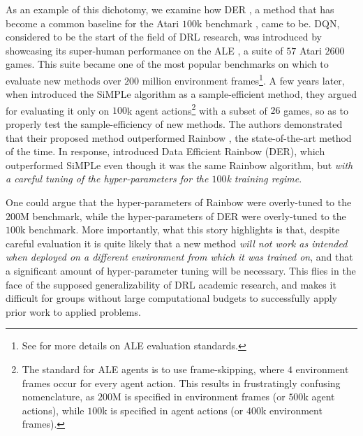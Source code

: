 \documentclass[10pt]{article} %
\begin{document}
As an example of this dichotomy, we examine how DER \citep{hasselt19when}, a method that has become a common baseline for the Atari $100$k benchmark \citep{kaiser2020modelbased}, came to be. DQN, considered to be the start of the field of DRL research, was introduced by showcasing its super-human performance on the ALE \citep{bellemare2012ale}, a suite of $57$ Atari $2600$ games. This suite became one of the most popular benchmarks on which to evaluate new methods over $200$ million environment frames\footnote{See \citep{machado2018revisiting} for more details on ALE evaluation standards.}. A few years later, when \citet{kaiser2020modelbased} introduced the SiMPLe algorithm as a sample-efficient method, they argued for evaluating it only on $100$k agent actions\footnote{The standard for ALE agents is to use frame-skipping, where $4$ environment frames occur for every agent action. This results in frustratingly confusing nomenclature, as $200$M is specified in environment frames (or $500$k agent actions), while $100$k is specified in agent actions (or $400$k environment frames).} with a subset of $26$ games, so as to properly test the sample-efficiency of new methods. The authors demonstrated that their proposed method outperformed Rainbow \citep{Hessel2018RainbowCI}, the state-of-the-art method of the time. In response, \citet{hasselt19when} introduced Data Efficient Rainbow (DER), which outperformed SiMPLe even though it was the same Rainbow algorithm, but {\em with a careful tuning of the hyper-parameters for the $100$k training regime}.

One could argue that the hyper-parameters of Rainbow were overly-tuned to the $200$M benchmark, while the hyper-parameters of DER were overly-tuned to the $100$k benchmark. More importantly, what this story highlights is that, despite careful evaluation it is quite likely that a new method {\em will not work as intended when deployed on a different environment from which it was trained on}, and that a significant  amount of hyper-parameter tuning will be necessary. This flies in the face of the supposed generalizability of DRL academic research, and makes it difficult for groups without large computational budgets to successfully apply prior work to applied problems.
\end{document}
